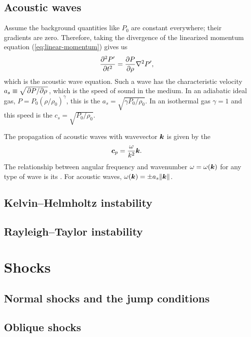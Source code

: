 \subsection{Acoustic waves}
Assume the background quantities like $P_0$ are constant everywhere; their gradients are zero. Therefore, taking the divergence of the linearized momentum equation (\ref{eq:linear-momentum}) gives us
\begin{align}
    \pdv[2]{P'}{t} = \pdv{P}{\rho} \laplacian{P'},
\end{align}
which is the acoustic wave equation. Such a wave has the characteristic velocity $a_s \equiv \sqrt{\pdv*{P}{\rho}}$, which is the speed of sound in the medium. In an adiabatic ideal gas, $P = P_0 (\rho/\rho_0)^\gamma$, this is the  $a_s = \sqrt{\gamma P_0/\rho_0}$. In an isothermal gas $\gamma = 1$ and this speed is the  $c_s = \sqrt{P_0/\rho_0}$.

The propagation of acoustic waves with wavevector $\vb*{k}$ is given by the 
\begin{align}
    \vb*{c}_p = \frac{\omega}{k^2} \vb*{k}.
\end{align}
The relationship between angular frequency and wavenumber $\omega = \omega(\vb*{k})$ for any type of wave is its . For acoustic waves, $\omega(\vb*{k}) = \pm a_s \norm{\vb*{k}}$.

\subsection{Kelvin--Helmholtz instability}

\subsection{Rayleigh--Taylor instability}


\section{Shocks}
\subsection{Normal shocks and the jump conditions}

\subsection{Oblique shocks}


